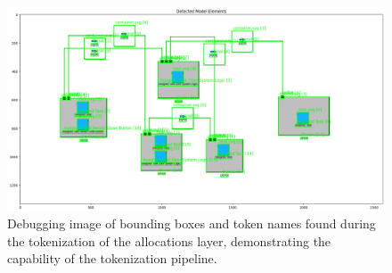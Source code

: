\begin{figure}[H]
    \centering
    \includegraphics[width=\textwidth]{pictures/allocations_found_tokens.png}
    \caption{Debugging image of bounding boxes and token names found during the tokenization of the allocations layer, demonstrating the capability of the tokenization pipeline.}
    \label{fig:allocations_found_tokens}
\end{figure}